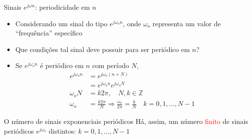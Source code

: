 \documentclass[
size=17pt,
paper=smartboard,
mode=present,
display=slidesnotes,
style=sailor,
nopagebreaks,
blackslide,
fleqn]{powerdot}
\begin{document}
\begin{slide}{Sinais $e^{j\omega n}$: periodicidade em $n$ }
   \begin{itemize}
    \item <1-3> Considerando um sinal do tipo $e^{j\omega_o n}$, onde $\omega_o$ representa um valor de ``frequência'' específico
     \item <2-3> Que condições tal sinal deve possuir para ser periódico em $n$?
     \item <3-3> Se $e^{j\omega_o n}$ é periódico em $n$ com período $N$,
        \begin{align*}
           e^{j\omega_o n} &= e^{j\omega_o (n+N)}\\
                           &= e^{j\omega_o n} e^{j\omega_o N}\\
             \omega_o N &= k2\pi, \quad N, k \in \mathbb{Z}\\
               \omega_o &= \frac{k2\pi}{N} \Rightarrow \frac{\omega_o}{2\pi} = \frac{k}{N}\quad k=0,1,\ldots, N-1
         \end{align*}%
\end{itemize}
\end{slide} 

\begin{note}{O número de sinais exponenciais periódicos}
   Há, assim, um número \textcolor{red}{finito} de sinais periódicos $e^{j\omega_o}$ distintos: $k=0,1,\ldots, N-1$
\end{note}
\end{document}
